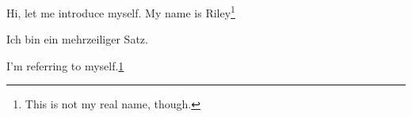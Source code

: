 \documentclass[a4paper]{article}
\begin{document}
Hi, let me introduce myself. My name is Riley\footnote{\label{myfootnote}This is not my real name, though.}

Ich bin \newline ein mehrzeiliger Satz.

\newpage

I'm referring to myself.\ref{myfootnote}
\end{document}
